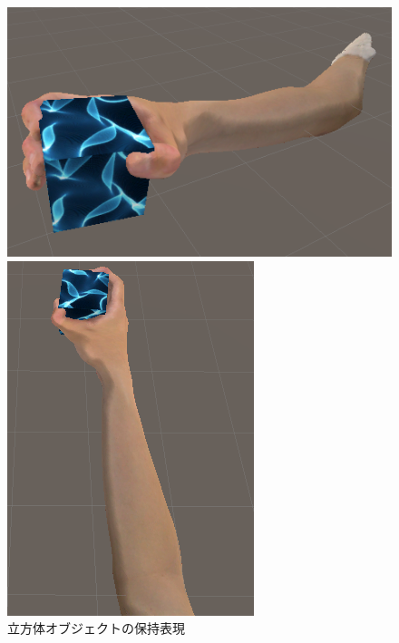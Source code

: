 \documentclass{ltjsreport}
\begin{document}
		\begin{figure}[H]
		\centering
		\begin{minipage}{0.4\columnwidth}
		\centering
		\includegraphics[width = \columnwidth]{../figs/grapcube_side.png}
		\end{minipage}
		\hspace{0.04\columnwidth}
		\begin{minipage}{0.2\columnwidth}
		\centering
		\includegraphics[width = \columnwidth]{../figs/grapcube_up.png}
		\end{minipage}
		\caption{立方体オブジェクトの保持表現}
		\label{fig:cubehold}
		\end{figure}
\end{document}
